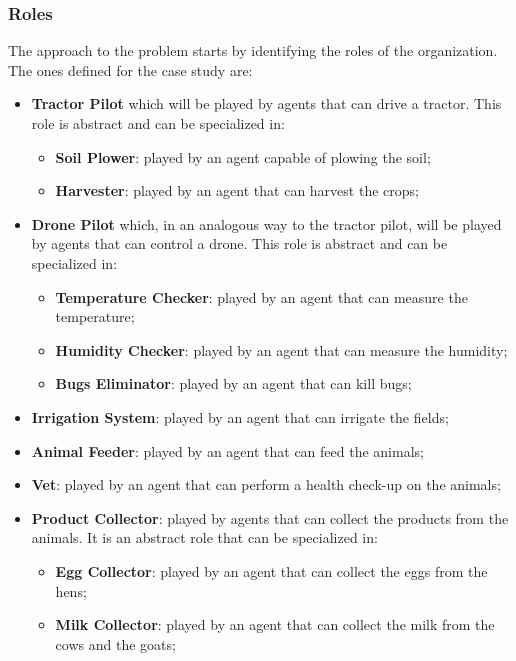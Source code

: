 \subsubsection{Roles}
The approach to the problem starts by identifying the roles of the organization.
The ones defined for the case study are:
\begin{itemize}
    \item \textbf{Tractor Pilot} which will be played by agents that can drive a tractor.
    This role is abstract and can be specialized in:
    \begin{itemize}
        \item \textbf{Soil Plower}: played by an agent capable of plowing the soil;
        \item \textbf{Harvester}: played by an agent that can harvest the crops;
    \end{itemize}
    \item \textbf{Drone Pilot} which, in an analogous way to the tractor pilot, will be played by agents that can control a drone.
    This role is abstract and can be specialized in:
    \begin{itemize}
        \item \textbf{Temperature Checker}: played by an agent that can measure the temperature;
        \item \textbf{Humidity Checker}: played by an agent that can measure the humidity;
        \item \textbf{Bugs Eliminator}: played by an agent that can kill bugs;
    \end{itemize}
    \item \textbf{Irrigation System}: played by an agent that can irrigate the fields;
    \item \textbf{Animal Feeder}: played by an agent that can feed the animals;
    \item \textbf{Vet}: played by an agent that can perform a health check-up on the animals;
    \item \textbf{Product Collector}: played by agents that can collect the products from the animals.
    It is an abstract role that can be specialized in:
    \begin{itemize}
        \item \textbf{Egg Collector}: played by an agent that can collect the eggs from the hens;
        \item \textbf{Milk Collector}: played by an agent that can collect the milk from the cows and the goats;
    \end{itemize}
\end{itemize}

